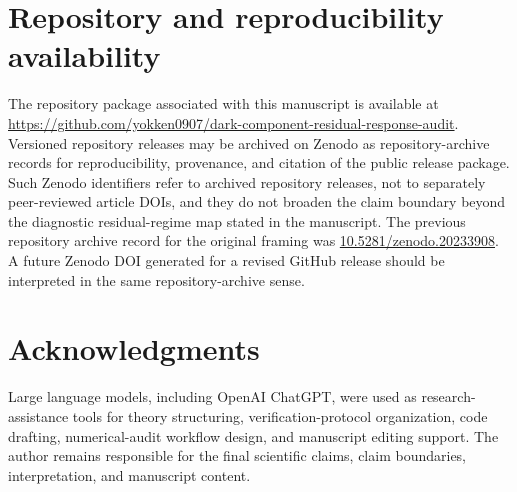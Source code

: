 \documentclass[11pt,a4paper]{article}
\begin{document}
\section*{Repository and reproducibility availability}
\sloppy
The repository package associated with this manuscript is available at \url{https://github.com/yokken0907/dark-component-residual-response-audit}. Versioned repository releases may be archived on Zenodo as repository-archive records for reproducibility, provenance, and citation of the public release package. Such Zenodo identifiers refer to archived repository releases, not to separately peer-reviewed article DOIs, and they do not broaden the claim boundary beyond the diagnostic residual-regime map stated in the manuscript. The previous repository archive record for the original framing was \href{https://doi.org/10.5281/zenodo.20233908}{10.5281/zenodo.20233908}. A future Zenodo DOI generated for a revised GitHub release should be interpreted in the same repository-archive sense.
\fussy

\section*{Acknowledgments}
Large language models, including OpenAI ChatGPT, were used as research-assistance tools for theory structuring, verification-protocol organization, code drafting, numerical-audit workflow design, and manuscript editing support. The author remains responsible for the final scientific claims, claim boundaries, interpretation, and manuscript content.
\end{document}
